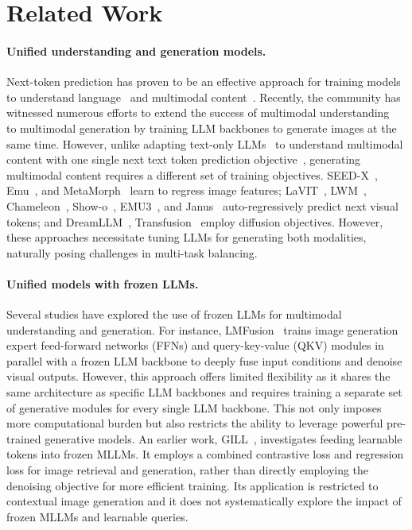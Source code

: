 \documentclass[]{fairmeta}
\begin{document}
\section{Related Work}

\paragraph{Unified understanding and generation models.}
Next-token prediction has proven to be an effective approach for training models to understand language~\citep{bert, gpt} and multimodal content~\citep{llava}. Recently, the community has witnessed numerous efforts to extend the success of multimodal understanding~\citep{llava} to multimodal generation by training LLM backbones to generate images at the same time. However, unlike adapting text-only LLMs~\citep{llama} to understand multimodal content with one single next text token prediction objective~\citep{llava}, generating multimodal content requires a different set of training objectives. SEED-X~\citep{seedx}, Emu~\citep{emu}, and MetaMorph~\citep{metamorph} learn to regress image features; LaVIT~\citep{lavit}, LWM~\citep{lwm}, Chameleon~\citep{chameleon}, Show-o~\citep{showo}, EMU3~\citep{emu3}, and Janus~\citep{janus,januspro} auto-regressively predict next visual tokens; and DreamLLM~\citep{dreamllm}, Transfusion~\citep{transfusion} employ diffusion objectives. However, these approaches necessitate tuning LLMs for generating both modalities, naturally posing challenges in multi-task balancing.

\paragraph{Unified models with frozen LLMs.}
Several studies have explored the use of frozen LLMs for multimodal understanding and generation. For instance, LMFusion~\citep{lmfusion} trains image generation expert feed-forward networks (FFNs) and query-key-value (QKV) modules in parallel with a frozen LLM backbone to deeply fuse input conditions and denoise visual outputs. However, this approach offers limited flexibility as it shares the same architecture as specific LLM backbones and requires training a separate set of generative modules for every single LLM backbone. This not only imposes more computational burden but also restricts the ability to leverage powerful pre-trained generative models. An earlier work, GILL~\citep{gill}, investigates feeding learnable tokens into frozen MLLMs. It employs a combined contrastive loss and regression loss for image retrieval and generation, rather than directly employing the denoising objective for more efficient training. Its application is restricted to contextual image generation and it does not systematically explore the impact of frozen MLLMs and learnable queries.
\end{document}
